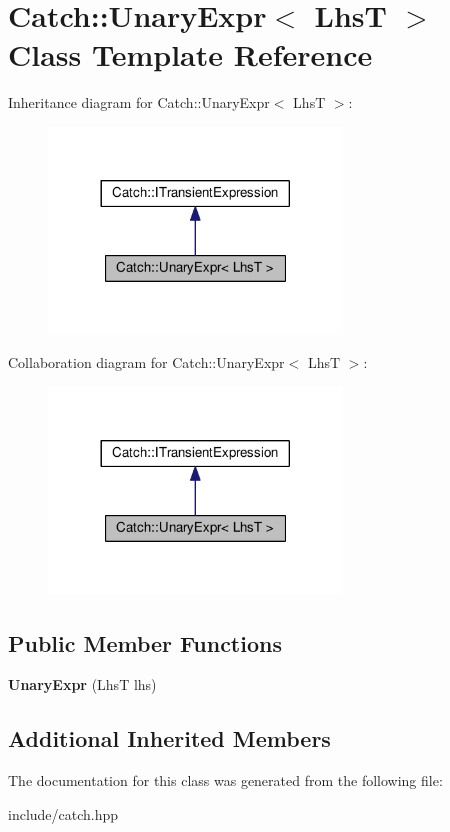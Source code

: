 \hypertarget{classCatch_1_1UnaryExpr}{}\section{Catch\+:\+:Unary\+Expr$<$ LhsT $>$ Class Template Reference}
\label{classCatch_1_1UnaryExpr}


Inheritance diagram for Catch\+:\+:Unary\+Expr$<$ LhsT $>$\+:\nopagebreak
\begin{figure}[H]
\begin{center}
\leavevmode
\includegraphics[width=221pt]{classCatch_1_1UnaryExpr__inherit__graph}
\end{center}
\end{figure}


Collaboration diagram for Catch\+:\+:Unary\+Expr$<$ LhsT $>$\+:\nopagebreak
\begin{figure}[H]
\begin{center}
\leavevmode
\includegraphics[width=221pt]{classCatch_1_1UnaryExpr__coll__graph}
\end{center}
\end{figure}
\subsection*{Public Member Functions}
\begin{DoxyCompactItemize}
\item 
{\bfseries Unary\+Expr} (LhsT lhs)\hypertarget{classCatch_1_1UnaryExpr_ae02f666a1e64da728628aa2033e1d6e7}{}\label{classCatch_1_1UnaryExpr_ae02f666a1e64da728628aa2033e1d6e7}

\end{DoxyCompactItemize}
\subsection*{Additional Inherited Members}


The documentation for this class was generated from the following file\+:\begin{DoxyCompactItemize}
\item 
include/catch.\+hpp\end{DoxyCompactItemize}
